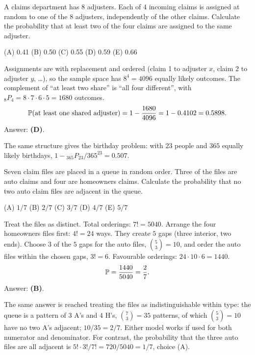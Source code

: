\begin{example}
A claims department has $8$ adjusters. Each of $4$ incoming claims is assigned at random to
one of the $8$ adjusters, independently of the other claims. Calculate the probability that at
least two of the four claims are assigned to the same adjuster.
\par\smallskip\noindent (A) 0.41 \quad (B) 0.50 \quad (C) 0.55 \quad (D) 0.59 \quad (E) 0.66
\end{example}
\begin{solution}
Assignments are with replacement and ordered (claim 1 to adjuster $x$, claim 2 to adjuster
$y$, \dots), so the sample space has $8^4 = 4096$ equally likely outcomes. The complement of
``at least two share'' is ``all four different'', with ${}_8P_4 = 8\cdot7\cdot6\cdot5 = 1680$
outcomes.
\[
\mathbb{P}(\text{at least one shared adjuster}) = 1 - \frac{1680}{4096} = 1 - 0.4102 = 0.5898 .
\]
Answer: \textbf{(D)}.

The same structure gives the birthday problem: with $23$ people and $365$ equally likely
birthdays, $1 - {}_{365}P_{23}/365^{23} = 0.507$.
\end{solution}

\begin{example}
Seven claim files are placed in a queue in random order. Three of the files are auto claims
and four are homeowners claims. Calculate the probability that no two auto claim files are
adjacent in the queue.
\par\smallskip\noindent (A) $1/7$ \quad (B) $2/7$ \quad (C) $3/7$ \quad (D) $4/7$ \quad (E) $5/7$
\end{example}
\begin{solution}
Treat the files as distinct. Total orderings: $7! = 5040$. Arrange the four homeowners files
first: $4! = 24$ ways. They create $5$ gaps (three interior, two ends). Choose $3$ of the $5$
gaps for the auto files, $\binom{5}{3} = 10$, and order the auto files within the chosen gaps,
$3! = 6$. Favourable orderings: $24\cdot 10\cdot 6 = 1440$.
\[
\mathbb{P} = \frac{1440}{5040} = \frac{2}{7} .
\]
Answer: \textbf{(B)}.

The same answer is reached treating the files as indistinguishable within type: the queue is
a pattern of $3$ A's and $4$ H's, $\binom{7}{3} = 35$ patterns, of which $\binom{5}{3} = 10$
have no two A's adjacent; $10/35 = 2/7$. Either model works if used for both numerator and
denominator. For contrast, the probability that the three auto files are all adjacent is
$5!\cdot 3!/7! = 720/5040 = 1/7$, choice (A).
\end{solution}

